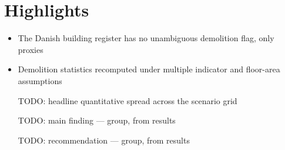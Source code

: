 \documentclass[12pt]{article}
\begin{document}
\section*{Highlights}

\begin{itemize}
  \item The Danish building register has no unambiguous demolition flag, only proxies
  \item Demolition statistics recomputed under multiple indicator and floor-area assumptions
  \item [TODO: headline quantitative spread across the scenario grid]
  \item [TODO: main finding --- group, from results]
  \item [TODO: recommendation --- group, from results]
\end{itemize}
\end{document}
